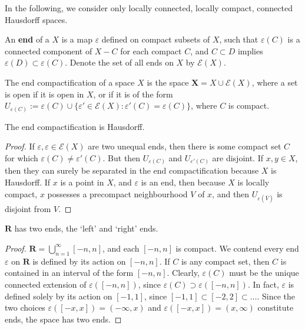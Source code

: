 \begin{example}
In the following, we consider only locally connected, locally compact, connected Hausdorff spaces.

\begin{definition}
    An {\bf end} of a $X$ is a map $\varepsilon$ defined on compact subsets of $X$, such that $\varepsilon(C)$ is a connected component of $X - C$ for each compact $C$, and $C \subset D$ implies $\varepsilon(D) \subset \varepsilon(C)$. Denote the set of all ends on $X$ by $\mathcal{E}(X)$.
\end{definition}

\begin{definition}
    The end compactification of a space $X$ is the space $\mathbf{X} = X \cup \mathcal{E}(X)$, where a set is open if it is open in $X$, or if it is of the form $U_{\varepsilon(C)} := \varepsilon(C) \cup \{ \varepsilon' \in \mathcal{E}(X) : \varepsilon'(C) = \varepsilon(C) \}$, where $C$ is compact.
\end{definition}

\begin{lemma}
    The end compactification is Hausdorff.
\end{lemma}
\begin{proof}
    If $\varepsilon, \varepsilon \in \mathcal{E}(X)$ are two unequal ends, then there is some compact set $C$ for which $\varepsilon(C) \neq \varepsilon'(C)$. But then $U_{\varepsilon(C)}$ and $U_{\varepsilon'(C)}$ are disjoint. If $x, y \in X$, then they can surely be separated in the end compactification because $X$ is Hausdorff. If $x$ is a point in $X$, and $\varepsilon$ is an end, then because $X$ is locally compact, $x$ possesses a precompact neighbourhood $V$ of $x$, and then $U_{\varepsilon(\overline{V})}$ is disjoint from $V$.
\end{proof}

\begin{lemma}
    $\mathbf{R}$ has two ends, the `left' and `right' ends.
\end{lemma}
\begin{proof}
    $\mathbf{R} = \bigcup_{n = 1}^\infty [-n, n]$, and each $[-n, n]$ is compact. We contend every end $\varepsilon$ on $\mathbf{R}$ is defined by its action on $[-n, n]$. If $C$ is any compact set, then $C$ is contained in an interval of the form $[-n, n]$. Clearly, $\varepsilon(C)$ must be the unique connected extension of $\varepsilon([-n, n])$, since $\varepsilon(C) \supset \varepsilon([-n,n])$. In fact, $\varepsilon$ is defined solely by its action on $[-1,1]$, since $[-1,1] \subset [-2,2] \subset \dots$. Since the two choices $\varepsilon([-x,x]) = (-\infty, x)$ and $\varepsilon([-x,x]) = (x,\infty)$ constitute ends, the space has two ends.
\end{proof}


\end{example}
